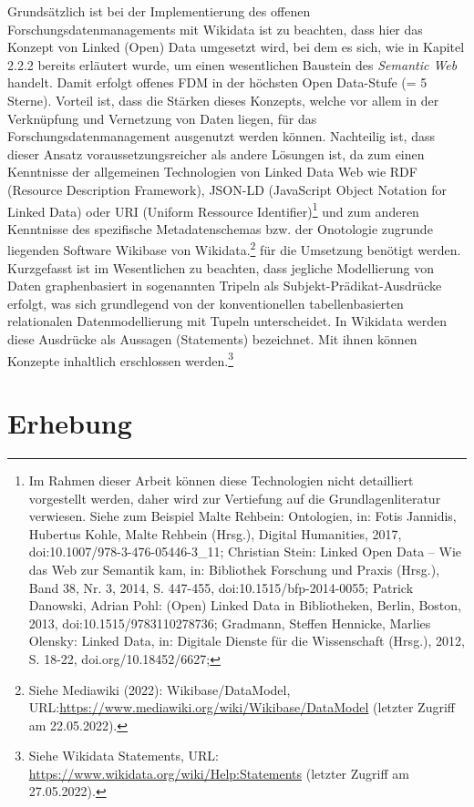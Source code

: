 Grundsätzlich ist bei der Implementierung des offenen Forschungsdatenmanagements mit Wikidata ist zu beachten, dass hier das Konzept von Linked (Open) Data umgesetzt wird, bei dem es sich, wie in Kapitel 2.2.2 bereits erläutert wurde, um einen wesentlichen Baustein des \textit{Semantic Web} handelt. Damit erfolgt offenes FDM in der höchsten Open Data-Stufe (= 5 Sterne). Vorteil ist, dass die Stärken dieses Konzepts, welche vor allem in der Verknüpfung und Vernetzung von Daten liegen, für das Forschungsdatenmanagement ausgenutzt werden können. Nachteilig ist, dass dieser Ansatz voraussetzungsreicher als andere Lösungen ist, da zum einen Kenntnisse der allgemeinen Technologien von Linked Data Web wie RDF (Resource Description Framework), JSON-LD (JavaScript Object Notation for Linked Data) oder URI (Uniform Ressource Identifier)\footnote{Im Rahmen dieser Arbeit können diese Technologien nicht detailliert vorgestellt werden, daher wird zur Vertiefung auf die Grundlagenliteratur verwiesen. Siehe zum Beispiel Malte Rehbein: Ontologien, in: Fotis Jannidis, Hubertus Kohle, Malte Rehbein (Hrsg.), Digital Humanities, 2017, doi:10.1007/978-3-476-05446-3\_11; Christian Stein: Linked Open Data – Wie das Web zur Semantik kam, in: Bibliothek Forschung und Praxis (Hrsg.), Band 38, Nr. 3, 2014, S. 447-455, doi:10.1515/bfp-2014-0055; Patrick Danowski, Adrian Pohl: (Open) Linked Data in Bibliotheken, Berlin, Boston, 2013, doi:10.1515/9783110278736; Gradmann, Steffen Hennicke, Marlies Olensky: Linked Data, in: Digitale Dienste für die Wissenschaft (Hrsg.), 2012, S. 18-22, doi.org/10.18452/6627;  } und zum anderen Kenntnisse des spezifische Metadatenschemas bzw. der Onotologie zugrunde liegenden Software Wikibase von Wikidata.\footnote{Siehe Mediawiki (2022): Wikibase/DataModel, URL:\url{https://www.mediawiki.org/wiki/Wikibase/DataModel} (letzter Zugriff am 22.05.2022).} für die Umsetzung benötigt werden. Kurzgefasst ist im Wesentlichen zu beachten, dass jegliche Modellierung von Daten graphenbasiert in sogenannten Tripeln als Subjekt-Prädikat-Ausdrücke erfolgt, was sich grundlegend von der konventionellen tabellenbasierten relationalen Datenmodellierung mit Tupeln unterscheidet. In Wikidata werden diese Ausdrücke als Aussagen (Statements) bezeichnet. Mit ihnen können Konzepte inhaltlich erschlossen werden.\footnote{Siehe Wikidata Statements, URL: \url{https://www.wikidata.org/wiki/Help:Statements} (letzter Zugriff am 27.05.2022).}

\section{Erhebung}

